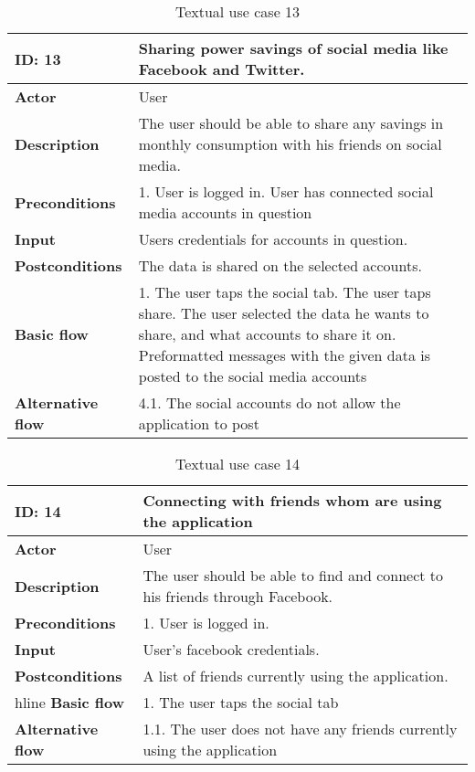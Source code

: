 \begin{table}[H]
\begin{tabular}{|l|p{11.7cm}|}
\hline
\textbf{ID: }13&\textbf{Sharing power savings of social media like Facebook and Twitter.}
\\\hline
\textbf{Actor} &User
\\\hline
\textbf{Description}&
The user should be able to share any savings in monthly consumption with his friends on social media.\\\hline
\textbf{Preconditions}&
1. User is logged in\newline
2. User has connected social media accounts in question\\\hline
\textbf{Input}&
Users credentials for accounts in question.\\\hline
\textbf{Postconditions}& 
The data is shared on the selected accounts. \\\hline
\textbf{Basic flow}&
1. The user taps the social tab\newline
2. The user taps share\newline
3. The user selected the data he wants to share, and what accounts to share it on\newline
4. Preformatted messages with the given data is posted to the social media accounts
\\\hline
\textbf{Alternative flow}&
4.1. The social accounts do not allow the application to post
\\\hline
\end{tabular}
\caption{Textual use case 13}
\end{table}

\begin{table}[H]
\begin{tabular}{|l|p{11.7cm}|}
\hline
\textbf{ID: }14&\textbf{Connecting with friends whom are using the application}
\\\hline
\textbf{Actor} &User
\\\hline
\textbf{Description}&
The user should be able to find and connect to his friends through Facebook.\\\hline
\textbf{Preconditions}&
1. User is logged in.\\\hline
\textbf{Input}&
User's facebook credentials.\\\hline
\textbf{Postconditions}& 
A list of friends currently using the application.\\hline
\textbf{Basic flow}&
1. The user taps the social tab
\\\hline
\textbf{Alternative flow}&
1.1. The user does not have any friends currently using the application
\\\hline
\end{tabular}
\caption{Textual use case 14}
\end{table}


